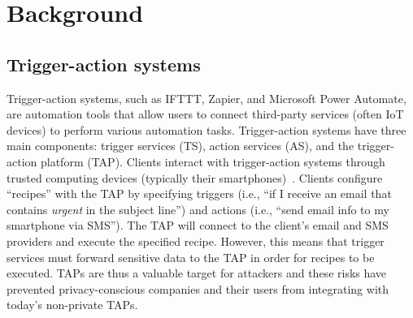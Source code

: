 \section{Background}
\label{sec:background}

\subsection{Trigger-action systems}

Trigger-action systems, such as IFTTT, Zapier, and Microsoft Power Automate, are
automation tools that allow users to connect third-party services (often IoT
devices) to perform various automation tasks. Trigger-action systems have three
main components: trigger services (TS), action services (AS), and the
trigger-action platform (TAP). Clients interact with trigger-action systems
through trusted computing devices (typically their
smartphones)~\cite{DBLP:conf/sp/ChenCWSCF21}. Clients configure ``recipes'' with
the TAP by specifying triggers (i.e., ``if I receive an email that contains
\emph{urgent} in the subject line'') and actions (i.e., ``send email info to my
smartphone via SMS''). The TAP will connect to the client's email and SMS
providers and execute the specified recipe. However, this means that trigger
services must forward sensitive data to the TAP in order for recipes to be
executed. TAPs are thus a valuable target for attackers and these risks have
prevented privacy-conscious companies and their users from integrating with
today's non-private TAPs.




